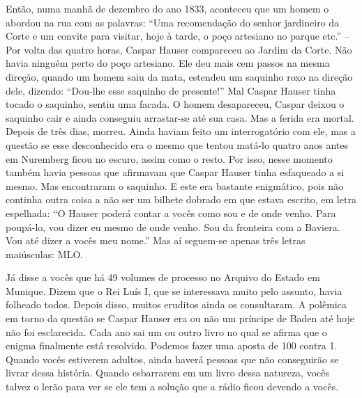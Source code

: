 Então, numa manhã de dezembro do ano 1833, aconteceu que um homem o
abordou na rua com as palavras: ``Uma recomendação do senhor jardineiro
da Corte e um convite para visitar, hoje à tarde, o poço artesiano no
parque etc.'' -- Por volta das quatro horas, Caspar Hauser compareceu ao
Jardim da Corte. Não havia ninguém perto do poço artesiano. Ele deu mais
cem passos na mesma direção, quando um homem saiu da mata, estendeu um
saquinho roxo na direção dele, dizendo: ``Dou-lhe esse saquinho de
presente!'' Mal Caspar Hauser tinha tocado o saquinho, sentiu uma
facada. O homem desapareceu, Caspar deixou o saquinho cair e ainda
conseguiu arrastar-se até sua casa. Mas a ferida era mortal. Depois de
três dias, morreu. Ainda haviam feito um interrogatório com ele, mas a
questão se esse desconhecido era o mesmo que tentou matá-lo quatro anos
antes em Nuremberg ficou no escuro, assim como o resto. Por isso, nesse
momento também havia pessoas que afirmavam que Caspar Hauser tinha
esfaqueado a si mesmo. Mas encontraram o saquinho. E este era bastante
enigmático, pois não continha outra coisa a não ser um bilhete dobrado
em que estava escrito, em letra espelhada: ``O Hauser poderá contar a
vocês como sou e de onde venho. Para poupá-lo, vou dizer eu mesmo de
onde venho. Sou da fronteira com a Baviera. Vou até dizer a vocês meu
nome.'' Mas aí seguem-se apenas três letras maiúsculas: MLO.

Já disse a vocês que há 49 volumes de processo no Arquivo do Estado em
Munique. Dizem que o Rei Luís I, que se interessava muito pelo assunto,
havia folheado todos. Depois disso, muitos eruditos ainda os
consultaram. A polêmica em torno da questão se Caspar Hauser era ou não
um príncipe de Baden até hoje não foi esclarecida. Cada ano sai um ou
outro livro no qual se afirma que o enigma finalmente está resolvido.
Podemos fazer uma aposta de 100 contra 1. Quando vocês estiverem
adultos, ainda haverá pessoas que não conseguirão se livrar dessa
história. Quando esbarrarem em um livro dessa natureza, vocês talvez o
lerão para ver se ele tem a solução que a rádio ficou devendo a vocês.




